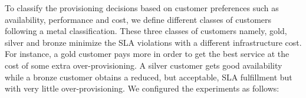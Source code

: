 
To classify the provisioning decisions based on customer preferences such as availability, performance and cost, we define different classes of customers following a metal classification. These three classes of customers namely, gold, silver and bronze minimize the SLA violations with a different infrastructure cost. For instance, a gold customer pays more in order to get the best service at the cost of some extra over-provisioning. A silver customer gets good availability while a bronze customer obtains a reduced, but acceptable, SLA fulfillment but with very little over-provisioning. We configured the experiments as follows:










